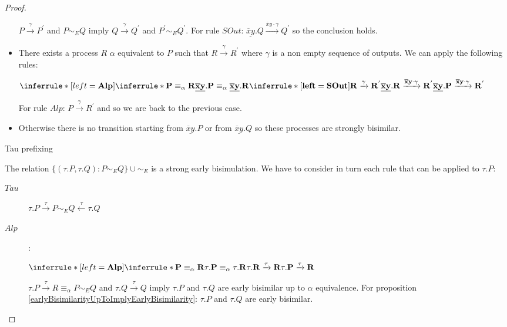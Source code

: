 \begin{lemma}
\begin{proof}
\begin{itemize}
\begin{center}
	    \end{center}
	    $P \xrightarrow{\gamma} P^{'}$ and $P \sim_{E} Q$ imply $Q \xrightarrow{\gamma} Q^{'}$ and $P^{'} \sim_{E} Q^{'}$. For rule $SOut$: $\underline{\overline{x}y}.Q \xrightarrow{\overline{x}y \cdot \gamma} Q^{'}$ so the conclusion holds.
	  \item
	    There exists a process $R$ $\alpha$ equivalent to $P$ such that $R \xrightarrow{\gamma} R^{'}$ where $\gamma$ is a non empty sequence of outputs. We can apply the following rules:
	    \begin{center}
	      $\inferrule* [left=\bf{Alp}]{
		  \inferrule* {
		    P \equiv_{\alpha} R
		  }{
		    \underline{\overline{x}y}.P \equiv_{\alpha} \underline{\overline{x}y}.R
		  }
		\\
		  \inferrule* [left=\bf{SOut}]{
		    R \xrightarrow{\gamma} R^{'}
		  }{
		    \underline{\overline{x}y}.R \xrightarrow{\overline{x}y \cdot \gamma} R^{'}
		  }
	      }{
		\underline{\overline{x}y}.P \xrightarrow{\overline{x}y \cdot \gamma} R^{'}
	      }$
	    \end{center}
	    For rule $Alp$: $P \xrightarrow{\gamma} R^{'}$ and so we are back to the previous case.
	  \item
	    Otherwise there is no transition starting from $\underline{\overline{x}y}.P$ or from $\underline{\overline{x}y}.Q$ so these processes are strongly bisimilar.
	\end{itemize}
    \begin{description}
      \item[Tau prefixing]
    \end{description}
	The relation $\{(\tau.P, \tau.Q): P\sim_{E} Q\} \cup \sim_{E}$ is a strong early bisimulation. We have to consider in turn each rule that can be applied to $\tau.P$:
	\begin{description}
	  \item[$Tau$]
	    $\tau.P \xrightarrow{\tau} P \sim_{E} Q \stackrel{\tau}{\longleftarrow} \tau.Q$
	  \item[$Alp$]:
	    \begin{center}
	      $\inferrule* [left=\bf{Alp}]{
		  \inferrule* {
		    P \equiv_{\alpha} R
		  }{
		    \tau.P \equiv_{\alpha} \tau.R
		  }
		\\
		  \tau.R \xrightarrow{\tau} R
	      }{
		  \tau.P \xrightarrow{\tau} R
	      }$
	    \end{center}
	    $\tau.P \xrightarrow{\tau} R \equiv_{\alpha} P \sim_{E} Q$ and $\tau.Q \xrightarrow{\tau} Q$ imply $\tau.P$ and $\tau.Q$ are early bisimilar up to $\alpha$ equivalence. For proposition \ref{earlyBisimilarityUpToImplyEarlyBisimilarity}: $\tau.P$ and $\tau.Q$ are early bisimilar.	    

\end{description}
\end{proof}
\end{lemma}
